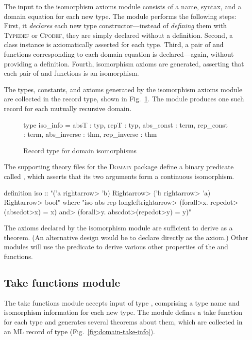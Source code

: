 The input to the isomorphism axioms module consists of a name, syntax, and a domain equation for each new type. The module performs the following steps: First, it \emph{declares} each new type constructor---instead of \emph{defining} them with \textsc{Typedef} or \textsc{Cpodef}, they are simply declared without a definition. Second, a  class instance is axiomatically asserted for each type. Third, a pair of  and  functions corresponding to each domain equation is declared---again, without providing a definition. Fourth, isomorphism axioms are generated, asserting that each pair of  and  functions is an isomorphism.

The types, constants, and axioms generated by the isomorphism axioms module are collected in the  record type, shown in Fig.~\ref{fig:domain-iso-info}. The module produces one such record for each mutually recursive domain.

\begin{figure}
\begin{hscode}
type iso_info =
  {
    absT        : typ,    repT        : typ,
    abs_const   : term,   rep_const   : term,
    abs_inverse : thm,    rep_inverse : thm
  }
\end{hscode}
\caption{Record type for domain isomorphisms}
\label{fig:domain-iso-info}
\end{figure}

The supporting theory files for the \textsc{Domain} package define a binary predicate called , which asserts that its two arguments form a continuous isomorphism.
%
\begin{isacode}
definition iso :: "('a \<rightarrow> 'b) \<Rightarrow> ('b \<rightarrow> 'a) \<Rightarrow> bool"
  where "iso abs rep \<longleftrightarrow> (\<forall>x. rep\<cdot>(abs\<cdot>x) = x) \<and> (\<forall>y. abs\<cdot>(rep\<cdot>y) = y)"
\end{isacode}
%
The axioms declared by the isomorphism module are sufficient to derive  as a theorem. (An alternative design would be to declare  directly as the axiom.) Other modules will use the  predicate to derive various other properties of the  and  functions.

\subsection{Take functions module}

The take functions module accepts input of type , comprising a type name and isomorphism information for each new type. The module defines a take function for each type and generates several theorems about them, which are collected in an ML record of type  (Fig.~\ref{fig:domain-take-info}).

